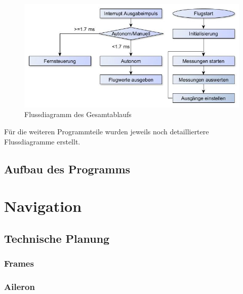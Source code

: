 \begin{itemize}
  \begin{figure}[tbh]
    \begin{centering}
      \includegraphics[width = \textwidth]{Bilder/Flussdiagramm}
    \par\end{centering}
    \caption{Flussdiagramm des Gesamtablaufs}
    \label{Flussdiragramm}
  \end{figure}

  Für die weiteren Programmteile wurden jeweils noch detailliertere Flussdiagramme erstellt.

  \subsection{Aufbau des Programms}






\section{Navigation}

  \subsection{Technische Planung}



    \subsubsection{Frames}



    \subsubsection{Aileron}

\end{itemize}

